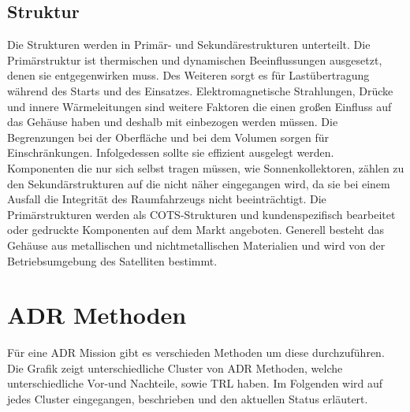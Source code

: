 		\subsection{Struktur}%
Die Strukturen werden in Primär- und Sekundärestrukturen unterteilt. Die Primärstruktur ist thermischen und dynamischen Beeinflussungen ausgesetzt, denen sie entgegenwirken muss. Des Weiteren sorgt es für Lastübertragung während des Starts und des Einsatzes. Elektromagnetische Strahlungen, Drücke und innere Wärmeleitungen sind weitere Faktoren die einen großen Einfluss auf das Gehäuse haben und deshalb mit einbezogen werden müssen. Die Begrenzungen bei der Oberfläche und bei dem Volumen sorgen für Einschränkungen. Infolgedessen sollte sie effizient ausgelegt werden. Komponenten die nur sich selbst tragen müssen, wie Sonnenkollektoren, zählen zu den Sekundärstrukturen auf die nicht näher eingegangen wird, da sie bei einem Ausfall die Integrität des Raumfahrzeugs nicht beeinträchtigt. Die Primärstrukturen werden als COTS-Strukturen und kundenspezifisch bearbeitet oder gedruckte Komponenten auf dem Markt angeboten. Generell besteht das Gehäuse aus metallischen und nichtmetallischen Materialien und wird von der Betriebsumgebung des Satelliten bestimmt. \cite[S. 96 - 108]{NASA.Sota.2018} 

	\section{ADR Methoden}
Für eine ADR Mission gibt es verschieden Methoden um diese durchzuführen. Die Grafik zeigt unterschiedliche Cluster von ADR Methoden, welche unterschiedliche Vor-und Nachteile, sowie TRL haben. Im Folgenden wird auf jedes Cluster eingegangen, beschrieben und den aktuellen Status erläutert.
	
